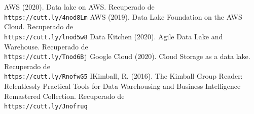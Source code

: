 \documentclass[twoside,twocolumn]{article}
\begin{document}
\begin{thebibliography}{99} 
    \bibitem{}
    AWS (2020). Data lake on AWS. Recuperado de 
    \\\texttt{https://cutt.ly/4nod8Lm}
    \bibitem{}
    AWS (2019). Data Lake Foundation on the AWS Cloud. Recuperado de 
    \\\texttt{https://cutt.ly/lnod5w8}
    \bibitem{}
    Data Kitchen (2020). Agile Data Lake and Warehouse. Recuperado de 
    \\\texttt{https://cutt.ly/Tnod6Bj}
    \bibitem{}
    Google Cloud (2020). Cloud Storage as a data lake. Recuperado de 
    \\\texttt{https://cutt.ly/RnofwG5}
    \bibitem{}
    IKimball, R. (2016). The Kimball Group Reader: Relentlessly Practical Tools for Data Warehousing and Business Intelligence Remastered Collection. Recuperado de 
    \\\texttt{https://cutt.ly/Jnofruq}
\end{thebibliography}
\end{document}
